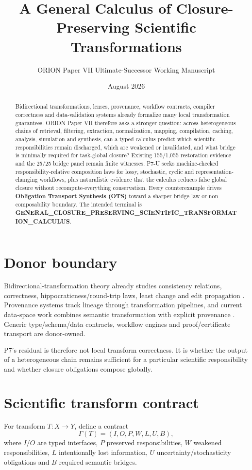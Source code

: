\documentclass[11pt]{article}
\title{A General Calculus of Closure-Preserving Scientific Transformations}
\author{ORION Paper VII Ultimate-Successor Working Manuscript}
\date{August 2026}
\begin{document}
\maketitle

\begin{abstract}
Bidirectional transformations, lenses, provenance, workflow contracts, compiler correctness and data-validation systems already formalize many local transformation guarantees. ORION Paper VII therefore asks a stronger question: across heterogeneous chains of retrieval, filtering, extraction, normalization, mapping, compilation, caching, analysis, simulation and synthesis, can a typed calculus predict which scientific responsibilities remain discharged, which are weakened or invalidated, and what bridge is minimally required for task-global closure? Existing 155/1,055 restoration evidence and the 25/25 bridge panel remain finite witnesses. P7-U seeks machine-checked responsibility-relative composition laws for lossy, stochastic, cyclic and representation-changing workflows, plus naturalistic evidence that the calculus reduces false global closure without recompute-everything conservatism. Every counterexample drives \textbf{Obligation Transport Synthesis (OTS)} toward a sharper bridge law or non-composability boundary. The intended terminal is \textbf{GENERAL\_CLOSURE\_PRESERVING\_SCIENTIFIC\_TRANSFORMATION\_CALCULUS}.
\end{abstract}

\section{Donor boundary}
Bidirectional-transformation theory already studies consistency relations, correctness, hippocraticness/round-trip laws, least change and edit propagation \cite{bx2018}. Provenance systems track lineage through transformation pipelines, and current data-space work combines semantic transformation with explicit provenance \cite{fair2026}. Generic type/schema/data contracts, workflow engines and proof/certificate transport are donor-owned.

P7's residual is therefore not local transform correctness. It is whether the output of a heterogeneous chain remains sufficient for a particular scientific responsibility and whether closure obligations compose globally.

\section{Scientific transform contract}
For transform $T:X\rightarrow Y$, define a contract
\[
\Gamma(T)=(I,O,P,W,L,U,B),
\]
where $I/O$ are typed interfaces, $P$ preserved responsibilities, $W$ weakened responsibilities, $L$ intentionally lost information, $U$ uncertainty/stochasticity obligations and $B$ required semantic bridges.
\end{document}
